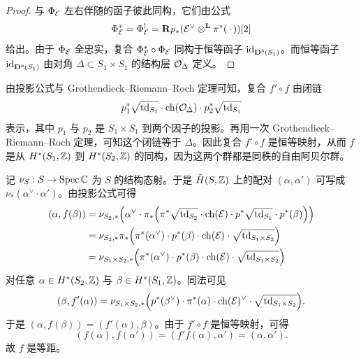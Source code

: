 
\begin{proof}
与 $\Phi_{\mathcal{E}}$ 左右伴随的函子彼此同构，它们由公式
\begin{equation*}
\Phi_{\mathcal{E}}^{*}=\Phi_{\mathcal{E}}^{!}=\mathbf{R} p_*(\mathcal{E}^{\vee}\otimes^{\mathbf{L}}\pi^*(\,\cdot\,))[2]
\end{equation*}
给出。由于 $\Phi_{\mathcal{E}}$ 全忠实，复合 $\Phi_{\mathcal{E}}^{*}\circ\Phi_{\mathcal{E}}$ 同构于恒等函子 $\mathrm{id}_{\mathbf{D}^{b}(S_1)}$。而恒等函子 $\mathrm{id}_{\mathbf{D}^{b}(S_1)}$ 由对角 $\Delta\subset S_1\times S_1$ 的结构层 $\mathcal{O}_\Delta$ 定义。
\end{proof}

由投影公式与 Grothendieck--Riemann--Roch 定理可知，复合 $f'\circ f$ 由闭链
\begin{equation*}
p_1^*\sqrt{\operatorname{td}_{S_1}}\cdot\operatorname{ch}(\mathcal{O}_\Delta)\cdot p_2^*\sqrt{\operatorname{td}_{S_1}}
\end{equation*}
表示，其中 $p_1$ 与 $p_2$ 是 $S_1\times S_1$ 到两个因子的投影。再用一次 Grothendieck--Riemann--Roch 定理，可知这个闭链等于 $\Delta$。因此复合 $f'\circ f$ 是恒等映射，从而 $f$ 是从 $H^*(S_1,\mathbb{Z})$ 到 $H^*(S_2,\mathbb{Z})$ 的同构，因为这两个群都是同秩的自由阿贝尔群。

记 $\nu_S:S\to\operatorname{Spec}\mathbb{C}$ 为 $S$ 的结构态射。于是 $\tilde H(S,\mathbb{Z})$ 上的配对 $(\alpha,\alpha')$ 可写成 $\nu_*(\alpha^{\vee}\cdot\alpha')$。由投影公式可得
\begin{equation*}
\begin{aligned}
(\alpha,f(\beta))
&=\nu_{S_2,*}\Bigl(\alpha^{\vee}\cdot\pi_*\Bigl(\pi^*\sqrt{\operatorname{td}_{S_2}}\cdot\operatorname{ch}(\mathcal{E})\cdot p^*\sqrt{\operatorname{td}_{S_1}}\cdot p^*(\beta)\Bigr)\Bigr)\\
&=\nu_{S_2,*}\pi_*\Bigl(\pi^*(\alpha^{\vee})\cdot p^*(\beta)\cdot\operatorname{ch}(\mathcal{E})\cdot\sqrt{\operatorname{td}_{S_1\times S_2}}\Bigr)\\
&=\nu_{S_1\times S_2,*}\Bigl(\pi^*(\alpha^{\vee})\cdot p^*(\beta)\cdot\operatorname{ch}(\mathcal{E})\cdot\sqrt{\operatorname{td}_{S_1\times S_2}}\Bigr)
\end{aligned}
\end{equation*}
对任意 $\alpha\in H^*(S_2,\mathbb{Z})$ 与 $\beta\in H^*(S_1,\mathbb{Z})$。同法可见
\begin{equation*}
(\beta,f'(\alpha))=\nu_{S_1\times S_2,*}\Bigl(p^*(\beta^{\vee})\cdot\pi^*(\alpha)\cdot\operatorname{ch}(\mathcal{E})^{\vee}\cdot\sqrt{\operatorname{td}_{S_1\times S_2}}\Bigr).
\end{equation*}
于是 $(\alpha,f(\beta))=(f'(\alpha),\beta)$。由于 $f'\circ f$ 是恒等映射，可得
\begin{equation*}
(f(\alpha),f(\alpha'))=(f'f(\alpha),\alpha')=(\alpha,\alpha').
\end{equation*}
故 $f$ 是等距。


